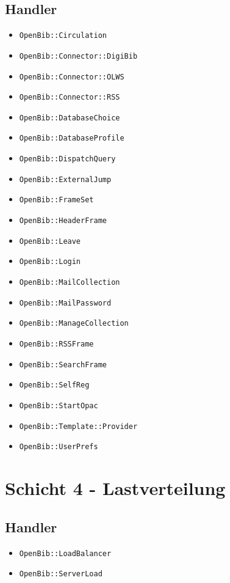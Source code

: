 \documentclass[11pt, twoside, a4paper, BCOR8mm, DIV12, bibtotoc,idxtotoc]{scrbook}
\begin{document}
\subsection{Handler}
\begin{itemize}
\item \texttt{OpenBib::Circulation}
\item \texttt{OpenBib::Connector::DigiBib}
\item \texttt{OpenBib::Connector::OLWS}
\item \texttt{OpenBib::Connector::RSS}
\item \texttt{OpenBib::DatabaseChoice}
\item \texttt{OpenBib::DatabaseProfile}
\item \texttt{OpenBib::DispatchQuery}
\item \texttt{OpenBib::ExternalJump}
\item \texttt{OpenBib::FrameSet}
\item \texttt{OpenBib::HeaderFrame}
\item \texttt{OpenBib::Leave}
\item \texttt{OpenBib::Login}
\item \texttt{OpenBib::MailCollection}
\item \texttt{OpenBib::MailPassword}
\item \texttt{OpenBib::ManageCollection}
\item \texttt{OpenBib::RSSFrame}
\item \texttt{OpenBib::SearchFrame}
\item \texttt{OpenBib::SelfReg}
\item \texttt{OpenBib::StartOpac}
\item \texttt{OpenBib::Template::Provider}
\item \texttt{OpenBib::UserPrefs}
\end{itemize}

\section{Schicht 4 - Lastverteilung}

\subsection{Handler}
\begin{itemize}
\item \texttt{OpenBib::LoadBalancer}
\item \texttt{OpenBib::ServerLoad}
\end{itemize}
\end{document}
